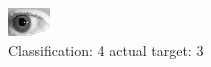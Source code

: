 \begin{figure}[h!]
\begin{center}
\includegraphics[width=0.60\columnwidth]{figures/ID337_class_4_target_3.png}
\end{center}
\caption{ Classification: 4 actual target: 3}
\label{fig:ID337_class_4_target_3}
\end{figure}
